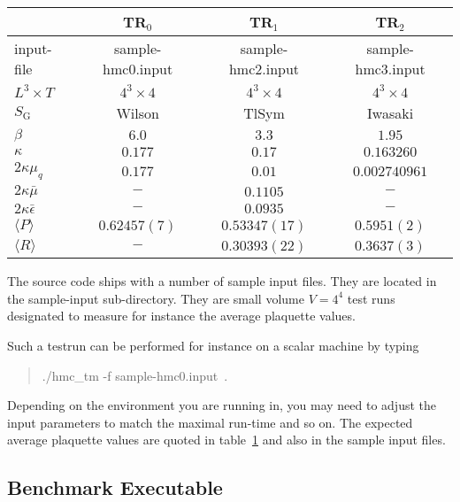 \begin{table}[t]
  \centering
  \begin{tabular}{lccc}
    \hline\hline
     & TR$_0$ & TR$_1$ & TR$_2$ \\
    \hline
    input-file & sample-hmc0.input & sample-hmc2.input &
    sample-hmc3.input \\
    $L^3\times T$ & $4^3\times 4$ & $4^3\times 4$ &
    $4^3\times 4$ \\

    $S_\mathrm{G}$ & Wilson & TlSym & Iwasaki \\
    $\beta $       & $6.0$  & $3.3$ & $1.95$ \\
    $\kappa$       & $0.177$ & $0.17$ & $0.163260$ \\
    $2\kappa\mu_q$ & $0.177$ & $0.01$ & $0.002740961$ \\
    $2\kappa \bar\mu$ & $-$  & $0.1105$ & $-$ \\
    $2\kappa \bar\epsilon$ & $-$ &$0.0935$ & $-$ \\
    $\langle P\rangle$ & $0.62457(7)$ & $0.53347(17)$ & $0.5951(2)$ \\
    $\langle R\rangle$ & $-$ & $0.30393(22)$ & $0.3637(3)$ \\
    \hline\hline
  \end{tabular}
  \caption{}
  \label{tab:testruns}
\end{table}

The source code ships with a number of sample input files. They are
located in the {\ttfamily sample-input} sub-directory. They are small
volume $V=4^4$ test runs designated to measure for instance the
average plaquette values.

Such a testrun can be performed for instance on a scalar machine by
typing 
\begin{quote}
  {\ttfamily ./hmc\_tm -f sample-hmc0.input}\ .
\end{quote}
Depending on the environment you are running in, you may need to adjust
the input parameters to match the maximal run-time and so on. The
expected average plaquette values are quoted in
table~\ref{tab:testruns} and also in the sample input files.

\subsection{Benchmark Executable}

